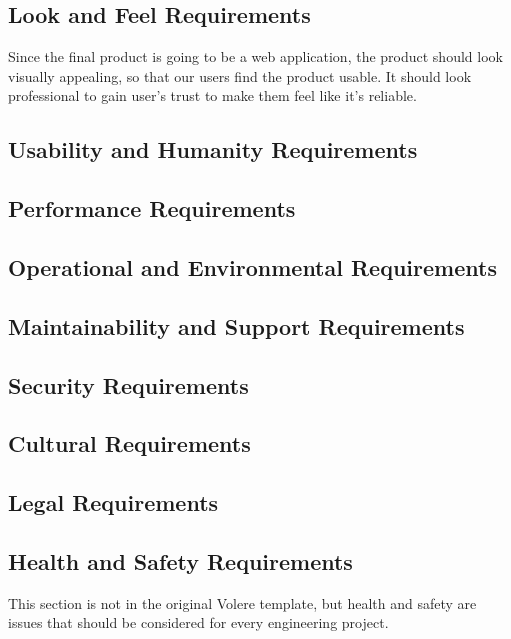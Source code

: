 \documentclass[12pt, titlepage]{article}
\begin{document}
\subsection{Look and Feel Requirements}
Since the final product is going to be a web application, the product should look visually appealing, so that our users find the product usable. It should look professional to gain user’s trust to make them feel like it's reliable.

\subsection{Usability and Humanity Requirements}

\subsection{Performance Requirements}

\subsection{Operational and Environmental Requirements}

\subsection{Maintainability and Support Requirements}

\subsection{Security Requirements}

\subsection{Cultural Requirements}

\subsection{Legal Requirements}

\subsection{Health and Safety Requirements}

This section is not in the original Volere template, but health and safety are
issues that should be considered for every engineering project.
\end{document}
